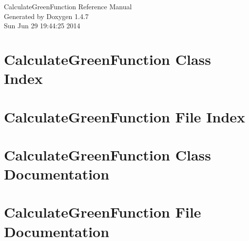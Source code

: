 \documentclass[a4paper]{book}
\begin{document}
\begin{titlepage}
\vspace*{7cm}
\begin{center}
{\Large Calculate\-Green\-Function Reference Manual}\\
\vspace*{1cm}
{\large Generated by Doxygen 1.4.7}\\
\vspace*{0.5cm}
{\small Sun Jun 29 19:44:25 2014}\\
\end{center}
\end{titlepage}
\clearemptydoublepage
{}
\tableofcontents
\clearemptydoublepage
{}
\chapter{Calculate\-Green\-Function Class Index}

\chapter{Calculate\-Green\-Function File Index}

\chapter{Calculate\-Green\-Function Class Documentation}








\chapter{Calculate\-Green\-Function File Documentation}




















\printindex
\end{document}
